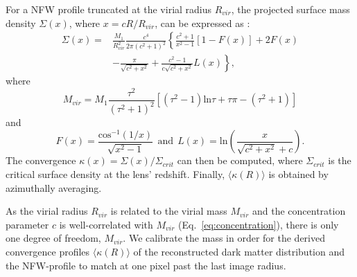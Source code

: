 \documentclass[useAMS,usenatbib]{mn2e}
\begin{document}
For a NFW profile truncated at the virial radius $R_{vir}$, the projected surface mass density $\Sigma(x)$, where $x = cR/R_{vir}$, can be expressed as \citep{2009JCAP...01..015B}:
\begin{equation}
 \begin{aligned}
  \Sigma(x) = & \frac{M_1}{R_{vir}^2}\frac{c^4}{2\pi(c^2+1)^2}\left\{\frac{c^2+1}{x^2-1}[1-F(x)]+2F(x) \right. \\
  & \left. -\frac{\pi}{\sqrt{c^2+x^2}}+\frac{c^2-1}{c\sqrt{c^2+x^2}}L(x)\right\},
 \end{aligned}
\end{equation}
where
\begin{equation}
  M_{vir} = M_{1} \frac{\tau^2}{(\tau^2+1)^2}\left[(\tau^2-1)\mathrm{ln}\tau+\tau\pi-(\tau^2+1)\right]
\end{equation}
and
\begin{equation}
  F(x) = \frac{\mathrm{cos}^{-1}(1/x)}{\sqrt{x^2-1}} \ \ \mathrm{and} \ \ L(x) = \mathrm{ln}\left(\frac{x}{\sqrt{c^2+x^2}+c}\right).
\end{equation}
The convergence $\kappa(x)=\Sigma(x)/\Sigma_{crit}$ can then be computed, where $\Sigma_{crit}$ is the critical surface density at the lens' redshift. Finally, $\langle\kappa(R)\rangle$ is obtained by azimuthally averaging.

As the virial radius $R_{vir}$ is related to the virial mass $M_{vir}$ and the concentration parameter $c$ is well-correlated with $M_{vir}$ (Eq.~\ref{eq:concentration}), there is only one degree of freedom, $M_{vir}$. We calibrate the mass in order for the derived convergence profiles $\langle\kappa(R)\rangle$ of the reconstructed dark matter distribution and the NFW-profile to match at one pixel past the last image radius.
\end{document}
